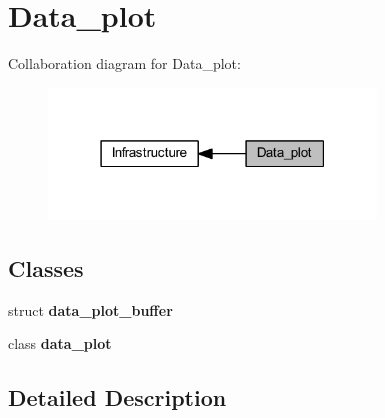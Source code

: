 \section{Data\+\_\+plot}
\label{group__data__plot}
Collaboration diagram for Data\+\_\+plot\+:
\nopagebreak
\begin{figure}[H]
\begin{center}
\leavevmode
\includegraphics[width=247pt]{group__data__plot}
\end{center}
\end{figure}
\subsection*{Classes}
\begin{DoxyCompactItemize}
\item 
struct \textbf{ data\+\_\+plot\+\_\+buffer}
\item 
class \textbf{ data\+\_\+plot}
\end{DoxyCompactItemize}


\subsection{Detailed Description}

